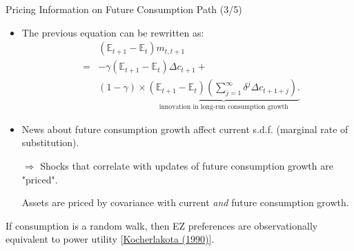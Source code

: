 \begin{frame}{Pricing Information on Future Consumption Path (3/5)}
\begin{footnotesize}
\begin{itemize}
	\item The previous equation can be rewritten as:
	\begin{eqnarray}\label{eq:sdfAbc}
	&& (\mathbb{E}_{t+1} - \mathbb{E}_t) m_{t,t+1} \nonumber \\
	 &=& - \gamma(\mathbb{E}_{t+1} - \mathbb{E}_t)\Delta c_{t+1} +  \\
	&&  (1 - \gamma) \times \underbrace{ (\mathbb{E}_{t+1} - \mathbb{E}_t) \left(  \sum_{j=1}^{\infty}  \delta^j \Delta c_{t+1+j}  \right).}_{\mbox{innovation in long-run consumption growth}}\nonumber
	\end{eqnarray}
	\item News about future consumption growth affect current s.d.f. (marginal rate of substitution).
	\item[$\Rightarrow$] Shocks that correlate with updates of future consumption growth are "priced".
	
	Assets are priced by covariance with current \textit{and} future consumption growth.
\end{itemize}
\begin{remark}\label{remark:Conso_iid}
If consumption is a random walk, then EZ preferences are observationally equivalent to power utility [\href{http://pages.stern.nyu.edu/~dbackus/Exotic/1Time\%20and\%20risk/Kocherlakota\%20JF\%2090.pdf}{Kocherlakota (1990)}].
\end{remark}
\end{footnotesize}
\end{frame}


